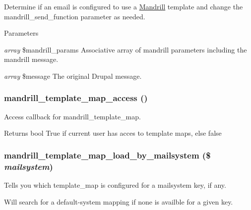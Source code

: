 Determine if an email is configured to use a \hyperlink{classMandrill}{Mandrill} template and change the mandrill\_\-send\_\-function parameter as needed.


\begin{DoxyParams}{Parameters}
\item[{\em array}]\$mandrill\_\-params Associative array of mandrill parameters including the mandrill message.\item[{\em array}]\$message The original Drupal message. \end{DoxyParams}
\hypertarget{mandrill__template_8module_a6a451669be92b42b30f8ef8ffa9cb315}{
\subsubsection[{mandrill\_\-template\_\-map\_\-access}]{\setlength{\rightskip}{0pt plus 5cm}mandrill\_\-template\_\-map\_\-access ()}}
\label{mandrill__template_8module_a6a451669be92b42b30f8ef8ffa9cb315}
Access callback for mandrill\_\-template\_\-map.

\begin{DoxyReturn}{Returns}
bool True if current user has acces to template maps, else false 
\end{DoxyReturn}
\hypertarget{mandrill__template_8module_a7f2ce537053644baac78cca50aff8c8f}{
\subsubsection[{mandrill\_\-template\_\-map\_\-load\_\-by\_\-mailsystem}]{\setlength{\rightskip}{0pt plus 5cm}mandrill\_\-template\_\-map\_\-load\_\-by\_\-mailsystem (\$ {\em mailsystem})}}
\label{mandrill__template_8module_a7f2ce537053644baac78cca50aff8c8f}
Tells you which template\_\-map is configured for a mailsystem key, if any.

Will search for a default-\/system mapping if none is availble for a given key.


